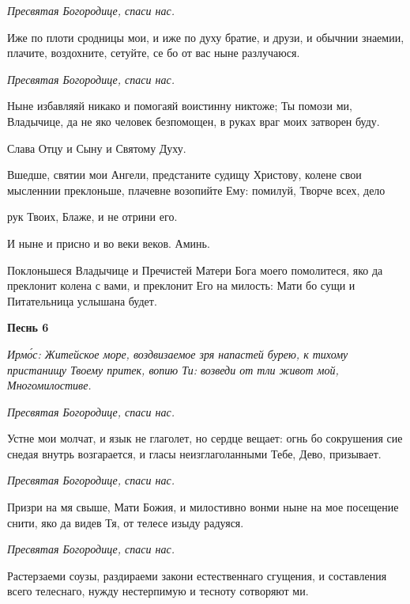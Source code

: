  \itshape  Пресвятая Богородице, спаси нас.
\normalfont{}


   Иже по плоти сродницы мои, и иже по духу братие, и друзи, и
обычнии знаемии, плачите, воздохните, сетуйте, се бо от вас ныне
разлучаюся.



 \itshape  Пресвятая Богородице, спаси нас.
\normalfont{}


   Ныне избавляяй никако и помогаяй воистинну никтоже; Ты помози ми,
Владычице, да не яко человек безпомощен, в руках враг моих затворен
буду.



   Слава Отцу и Сыну и Святому Духу.



   Вшедше, святии мои Ангели, предстаните судищу Христову, колене свои
мысленнии преклоньше, плачевне возопийте Ему: помилуй, Творче всех, дело

рук Твоих, Блаже, и не отрини его.



   И ныне и присно и во веки веков. Аминь.



   Поклоньшеся Владычице и Пречистей Матери Бога моего помолитеся,
яко да преклонит колена с вами, и преклонит Его на милость: Мати бо сущи
и Питательница услышана будет.



 

\bfseries Песнь 6\normalfont{}


 \itshape Ирмо́с:\normalfont{} Житейское море, воздвизаемое зря напастей бурею, к тихому
пристанищу Твоему притек, вопию Ти: возведи от тли живот мой, Многомилостиве.



 \itshape  Пресвятая Богородице, спаси нас.
\normalfont{}


   Устне мои молчат, и язык не глаголет, но сердце вещает: огнь бо
сокрушения сие снедая внутрь возгарается, и гласы неизглаголанными Тебе,
Дево, призывает.



 \itshape  Пресвятая Богородице, спаси нас.
\normalfont{}


   Призри на мя свыше, Мати Божия, и милостивно вонми ныне на мое
посещение снити, яко да видев Тя, от телесе изыду радуяся.



 \itshape  Пресвятая Богородице, спаси нас.
\normalfont{}


   Растерзаеми соузы, раздираеми закони естественнаго сгущения, и
составления всего телеснаго, нужду нестерпимую и тесноту сотворяют
ми.



